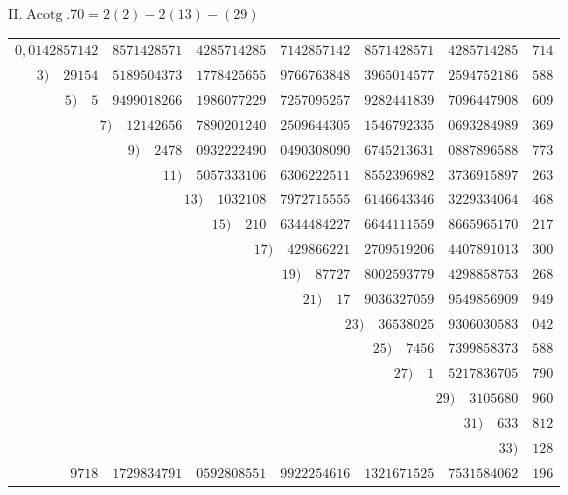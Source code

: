 \par{}
%
\begin{center}II.\quad $\operatorname{Acotg}.70=2(2)-2(13)-(29)$\end{center}
\begingroup\fontsize{8.5}{11}\selectfont\setlength{\tabcolsep}{2pt}
\begin{longtable}{@{}rrrrrrr@{}}
\hline
$0{,}0142857142$ & $8571428571$ & $4285714285$ & $7142857142$ & $8571428571$ & $4285714285$ & $714$\\
$3)\quad 29154$ & $5189504373$ & $1778425655$ & $9766763848$ & $3965014577$ & $2594752186$ & $588$\\
$5)\quad 5$ & $9499018266$ & $1986077229$ & $7257095257$ & $9282441839$ & $7096447908$ & $609$\\
\multicolumn{2}{r}{$7)\quad 12142656$} & $7890201240$ & $2509644305$ & $1546792335$ & $0693284989$ & $369$\\
\multicolumn{2}{r}{$9)\quad 2478$} & $0932222490$ & $0490308090$ & $6745213631$ & $0887896588$ & $773$\\
 & \multicolumn{2}{r}{$11)\quad 5057333106$} & $6306222511$ & $8552396982$ & $3736915897$ & $263$\\
 & \multicolumn{2}{r}{$13)\quad 1032108$} & $7972715555$ & $6146643346$ & $3229334064$ & $468$\\
 & \multicolumn{2}{r}{$15)\quad 210$} & $6344484227$ & $6644111559$ & $8665965170$ & $217$\\
 &  & \multicolumn{2}{r}{$17)\quad 429866221$} & $2709519206$ & $4407891013$ & $300$\\
 &  & \multicolumn{2}{r}{$19)\quad 87727$} & $8002593779$ & $4298858753$ & $268$\\
 &  & \multicolumn{2}{r}{$21)\quad 17$} & $9036327059$ & $9549856909$ & $949$\\
 &  &  & \multicolumn{2}{r}{$23)\quad 36538025$} & $9306030583$ & $042$\\
 &  &  & \multicolumn{2}{r}{$25)\quad 7456$} & $7399858373$ & $588$\\
 &  &  & \multicolumn{2}{r}{$27)\quad 1$} & $5217836705$ & $790$\\
 &  &  &  & \multicolumn{2}{r}{$29)\quad 3105680$} & $960$\\
 &  &  &  & \multicolumn{2}{r}{$31)\quad 633$} & $812$\\
 &  &  &  &  & \multicolumn{2}{r}{$33)\quad 128$}\\
\hline
$9718$ & $1729834791$ & $0592808551$ & $9922254616$ & $1321671525$ & $7531584062$ & $196$\\

\end{longtable}
